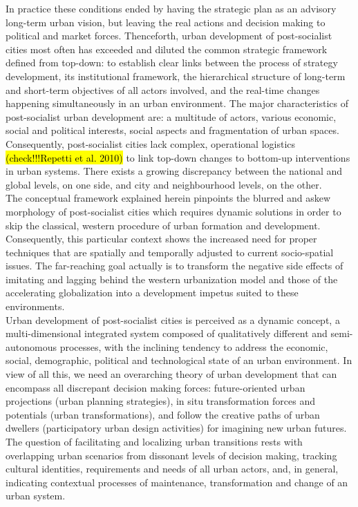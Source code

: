 \documentclass[11pt]{report}
\begin{document}
In practice these conditions ended by having the strategic plan as an advisory long-term urban vision, but leaving the real actions and decision making to political and market forces. Thenceforth, urban development of post-socialist cities most often has exceeded and diluted the common strategic framework defined from top-down: to establish clear links between the process of strategy development, its institutional framework, the hierarchical structure of long-term and short-term objectives of all actors involved, and the real-time changes happening simultaneously in an urban environment. The major characteristics of post-socialist urban development are: a multitude of actors, various economic, social and political interests, social aspects and fragmentation of urban spaces. Consequently, post-socialist cities lack complex, operational logistics \hl{(check!!!Repetti et al. 2010)} to link top-down changes to bottom-up interventions in urban systems. There exists a growing discrepancy between the national and global levels, on one side, and city and neighbourhood levels, on the other. 
\\
The  conceptual  framework  explained  herein  pinpoints  the  blurred  and  askew  morphology of  post-socialist  cities which  requires  dynamic  solutions  in  order  to  skip  the  classical, western procedure  of  urban  formation  and development. Consequently, this particular context shows the increased need for proper techniques that are spatially and temporally adjusted to current socio-spatial issues. The far-reaching goal actually is to transform the negative side effects of imitating and lagging behind the western urbanization model and those of the accelerating globalization into a development impetus suited to these environments.
\\
Urban development of post-socialist cities is perceived as a dynamic concept, a multi-dimensional integrated system composed of qualitatively different and semi-autonomous processes, with the inclining tendency to address the economic, social, demographic, political and technological state of an urban environment. In view of all this, we need an overarching theory of urban development that can encompass all discrepant decision making forces: future-oriented urban projections (urban planning strategies), in situ transformation forces and potentials (urban transformations), and follow the creative paths of urban dwellers (participatory urban design activities) for imagining new urban futures. The question of facilitating and localizing urban transitions rests with overlapping urban scenarios from dissonant levels of decision making, tracking cultural identities, requirements and needs of all urban actors, and, in general, indicating contextual processes of maintenance, transformation and change of an urban system. 
\end{document}
